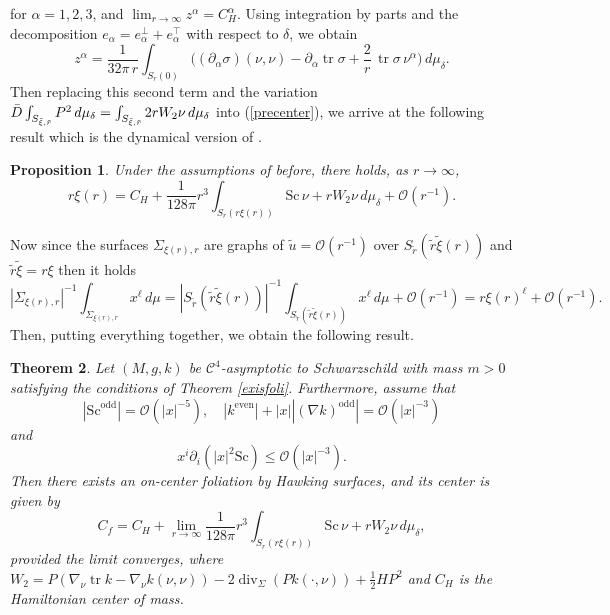 \documentclass[12pt,a4paper]{amsart}
\theoremstyle{plain}
\newtheorem{theorem}{Theorem}[section]
\newtheorem{proposition}[theorem]{Proposition}
\theoremstyle{definition}
\newcommand{\diver}{\operatorname{div}}
\newcommand{\tr}{\operatorname{tr}}
\begin{document}
for $\alpha = 1,2,3$, and $\lim_{r \to \infty} z^\alpha = C_H^\alpha .$ Using integration by parts and the decomposition
\(e_\alpha = e_\alpha^{\perp} + e_\alpha^{\top}\)
with respect to \(\delta\),
we obtain
\begin{equation}
z^\alpha
=
\frac{1}{32\pi\,r}
\int_{S_r(0)}
\big(
(\partial_\alpha \sigma)(\nu, \nu)
- \partial_\alpha \tr \sigma
+\frac{2}{r} \, \tr\sigma \,\nu^\alpha
\big)
\, d\mu_\delta. 
\end{equation}
Then replacing this second term and the variation  $\Bar{D} \int_{S_{\tilde{\xi},\tilde{r}}} P^2 \, d\mu_{\delta}= \int_{S_{\tilde{\xi},\tilde{r}}}2 r W_2 \nu \, d\mu_{\delta}$ into (\ref{precenter}), we arrive at the following result which is  the dynamical version of  \cite[Corollary 19]{willcen}.
\begin{proposition}
Under the assumptions of before,    there holds, as \(r \to \infty\),
\begin{equation}\label{lambdaxi}
r \xi(r) = C_H + \frac{1}{128 \pi} r^3 \int_{S_r(r \xi(r))} \mathrm{Sc} \, \nu +r W_2 \nu \, d\mu_{\delta} + \mathcal{O}(r^{-1}).
\end{equation}
\end{proposition}
Now since the surfaces $ \Sigma_{\xi(r), r}$ are graphs of $\tilde{u}= \mathcal{O}(r^{-1}) $ over  $S_{\tilde{r}}(\tilde{r} \tilde{\xi}(r))$ and $ \tilde{r} \tilde{\xi}=r \xi $ then it holds
\begin{equation}   
|\Sigma_{\xi(r), r}|^{-1} \int_{\Sigma_{\xi(r), r}} x^\ell \, d\mu =|S_{\tilde{r}}(\tilde{r} \tilde{\xi}(r))|^{-1} \int_{S_{\tilde{r}}(\tilde{r} \tilde{\xi}(r))} x^\ell \, d\mu +\mathcal{O}(r^{-1})= r \xi(r)^\ell + \mathcal{O}(r^{-1}).
\end{equation}
Then, putting everything together, we obtain the following result. 
\begin{theorem}\label{centerfolia}
   Let $(M,g,k)$ be $ \mathcal{C}^4$-asymptotic to Schwarzschild with mass $m>0$ satisfying the conditions of Theorem \ref{exisfoli}.  Furthermore, assume that 
   \begin{equation}
   |\mathrm{Sc}^{\text{odd}} |=\mathcal{O} ( |x|^{-5}), \quad  |k^{\text{even}}| + |x||(\nabla k)^{\text{odd}}| = \mathcal{O} (|x|^{-3})
\end{equation}
and 
\begin{equation}
    x^i \partial_i (|x|^2 \mathrm{Sc}) \leq \mathcal{O}( |x|^{-3}).
\end{equation}
 Then there exists an on-center foliation by Hawking surfaces, and its center is given by 
\begin{equation}\label{centerhawking}
    C_{f}= C_H+ \lim_{r \to \infty}\frac{1}{128 \pi} r^3 \int_{S_r(r \xi(r))}  \mathrm{Sc}\, \nu +r W_2 \nu \, d\mu_{\delta},
\end{equation}
 provided the limit converges, where $W_2= P( \nabla_\nu \tr k - \nabla_\nu k(\nu,\nu )) - 2 \diver_\Sigma (P k(\cdot, \nu))  +\frac{1}{2}H P^2 $ and $C_H$ is the Hamiltonian center of mass.
\end{theorem}
\end{document}
